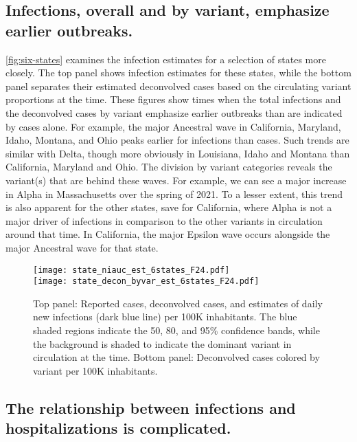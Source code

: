     
\subsection{Infections, overall and by variant, emphasize earlier outbreaks.}
\label{sec:infections-by-voc}

\autoref{fig:six-states} examines the infection estimates for a selection of
states more closely. The top panel shows infection estimates for these states,
while the bottom panel separates their estimated deconvolved cases based on the
circulating variant proportions at the time. These figures show times when the
total infections and the deconvolved cases by variant 
emphasize earlier outbreaks than are indicated by cases alone. For example,
the major Ancestral wave in California, Maryland, Idaho, Montana, and Ohio
peaks earlier for infections than cases. Such trends are similar with Delta,
though more obviously in Louisiana, Idaho and Montana than California, Maryland
and Ohio. The division by variant categories reveals the variant(s) that
are behind these waves. For example, we can see a major increase in Alpha in 
Massachusetts over the spring of 2021. To a lesser extent, this trend is also apparent
 for the other states, save for California, where Alpha is not a major driver of infections 
 in comparison to the other variants in circulation around that time. In California, 
 the major Epsilon wave occurs alongside the major Ancestral wave for that state.



\begin{figure}[!tb]
\centering
    \texttt{[image: state\_niauc\_est\_6states\_F24.pdf]}\\
    \texttt{[image: state\_decon\_byvar\_est\_6states\_F24.pdf]}
    \caption{Top panel: Reported cases, deconvolved cases, and estimates of
    daily new infections (dark blue line) per 100K inhabitants. The blue shaded
    regions indicate the 50, 80, and 95\% confidence bands, while the background
    is shaded to indicate the dominant variant in circulation at the time.  
    Bottom panel: Deconvolved cases colored by variant per 100K inhabitants.}
    \label{fig:six-states}
\end{figure}


\subsection{The relationship between infections and hospitalizations is complicated.}
\label{sec:lagged-correlations}


